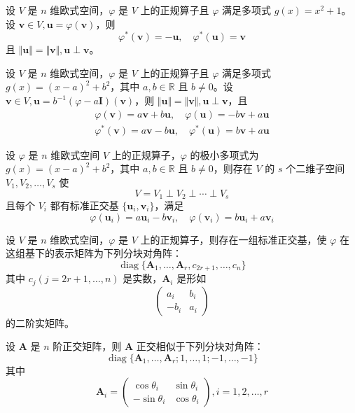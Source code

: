 \begin{lemma}
    设 $V$ 是 $n$ 维欧式空间，$\varphi$ 是 $V$ 上的正规算子且 $\varphi$ 满足多项式 $g(x) = x^2 + 1$。设 $\bm{v} \in V, \bm{u} = \varphi(\bm{v})$，则
    \[
        \varphi^*(\bm{v}) = -\bm{u},\quad \varphi^*(\bm{u}) = \bm{v}
    \]
    且 $\Vert \bm{u} \Vert = \Vert \bm{v} \Vert, \bm{u} \perp \bm{v}$。
\end{lemma}

\begin{lemma}
    设 $V$ 是 $n$ 维欧式空间，$\varphi$ 是 $V$ 上的正规算子且 $\varphi$ 满足多项式 $g(x) = (x - a)^2 + b^2$，其中 $a, b \in \mathbb{R}$ 且 $b \neq 0$。设 $\bm{v} \in V, \bm{u} = b^{-1}(\varphi - a \bm{I})(\bm{v})$，则 $\Vert \bm{u} \Vert = \Vert \bm{v} \Vert, \bm{u} \perp \bm{v}$，且
    \begin{gather*}
        \varphi(\bm{v}) = a \bm{v} + b \bm{u}, \quad \varphi(\bm{u}) = -b \bm{v} + a \bm{u} \\
        \varphi^*(\bm{v}) = a \bm{v} - b \bm{u}, \quad \varphi^*(\bm{u}) = b \bm{v} + a \bm{u}
    \end{gather*}
\end{lemma}

\begin{theorem}
    设 $\varphi$ 是 $n$ 维欧式空间 $V$ 上的正规算子，$\varphi$ 的极小多项式为 $g(x) = (x - a)^2 + b^2$，其中 $a, b \in \mathbb{R}$ 且 $b \neq 0$，则存在 $V$ 的 $s$ 个二维子空间 $V_1, V_2, \ldots, V_s$ 使
    \[
        V = V_1 \perp V_2 \perp \cdots \perp V_s
    \]
    且每个 $V_i$ 都有标准正交基 $\{\bm{u}_i, \bm{v}_i\}$，满足
    \[
        \varphi(\bm{u}_i) = a \bm{u}_i - b \bm{v}_i, \quad \varphi(\bm{v}_i) = b \bm{u}_i + a \bm{v}_i
    \]
\end{theorem}

\begin{theorem}
    设 $V$ 是 $n$ 维欧式空间，$\varphi$ 是 $V$ 上的正规算子，则存在一组标准正交基，使 $\varphi$ 在这组基下的表示矩阵为下列分块对角阵：
    \[
        \operatorname{diag}\{\bm{A}_1, \ldots, \bm{A}_r, c_{2r + 1}, \ldots, c_n\}
    \]
    其中 $c_{j}(j = 2r + 1, \ldots, n)$ 是实数，$\bm{A}_i$ 是形如
    \[
        \begin{pmatrix}
            a_i  & b_i \\
            -b_i & a_i
        \end{pmatrix}
    \]
    的二阶实矩阵。
\end{theorem}

\begin{theorem}
    设 $\bm{A}$ 是 $n$ 阶正交矩阵，则 $\bm{A}$ 正交相似于下列分块对角阵：
    \[
        \operatorname{diag}\{\bm{A}_1, \ldots, \bm{A}_r; 1, \ldots, 1; -1, \ldots, -1\}
    \]
    其中
    \[
        \bm{A}_i = \begin{pmatrix}
            \cos \theta_i  & \sin \theta_i \\
            -\sin \theta_i & \cos \theta_i
        \end{pmatrix}, i = 1, 2, \ldots, r
    \]
\end{theorem}

